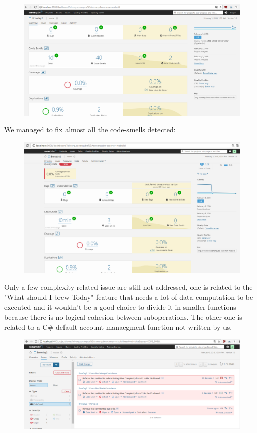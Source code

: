 \documentclass[12pt]{article}
\begin{document}
\begin{figure}[H]
\includegraphics[scale=0.5]{sonar3.png}
\end{figure}
We managed to fix almost all the code-smells detected:
\begin{figure}[H]
\includegraphics[scale=0.5]{sonar4.png}
\end{figure}
Only a few complexity related issue are still not addressed, one is related to the "What should I brew Today" feature that needs
a lot of data computation to be executed and it wouldn't be a good choice to divide it in smaller functions because
there is no logical cohesion between suboperations. The other one is related to a C\# default account manaegment function not written by us.
\begin{figure}[H]
\includegraphics[scale=0.5]{code-smell.png}
\end{figure}
\end{document}
